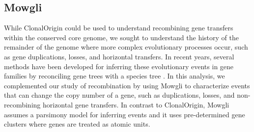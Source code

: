\documentclass[english]{article}
\begin{document}
\subsection{Mowgli}
While ClonalOrigin could be used to understand recombining gene
transfers within the conserved core genome, we sought to understand
the history of the remainder of the genome where more complex
evolutionary processes occur, such as gene duplications, losses, and
horizontal transfers.  In recent years, several methods have been
developed for inferring these evolutionary events in gene families by
reconciling gene trees with a species tree
\citep{David2011,Doyon2011,Tofigh2011}.  In this analysis, we
complemented our study of recombination by using Mowgli
\citep{Doyon2011} to characterize events that can change the copy
number of a gene, such as duplications, losses, and non-recombining
horizontal gene transfers.  In contrast to ClonalOrigin, Mowgli
assumes a parsimony model for inferring events and it uses
pre-determined gene clusters where genes are treated as atomic units.
\end{document}
